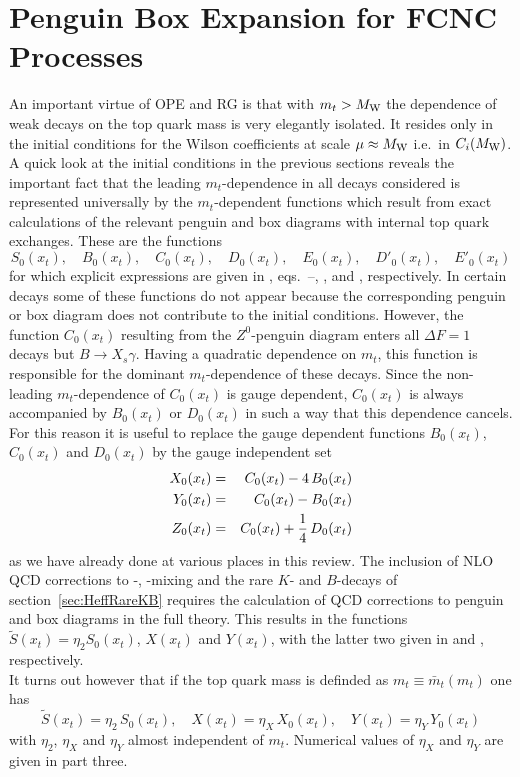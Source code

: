 \section{Penguin Box Expansion for FCNC Processes}
         \label{sec:PBE}
An important virtue of OPE and RG is that with $m_t > M_{\rm W}$ the
dependence of weak decays on the top quark mass is very elegantly
isolated. It resides only in the initial conditions for the Wilson
coefficients at scale $\mu \approx M_{\rm W}$ i.e.~in $C_i(M_{\rm W})$. A quick look
at the initial conditions in the previous sections reveals the important
fact that the leading $m_t$-dependence in all decays considered is
represented universally by the $m_t$-dependent functions which result
from exact calculations of the relevant penguin and box diagrams with
internal top quark exchanges. These are the functions
\begin{equation}
S_0(x_t), \quad
B_0(x_t), \quad
C_0(x_t), \quad
D_0(x_t), \quad
E_0(x_t), \quad
D'_0(x_t), \quad
E'_0(x_t)
\label{eq:SBCDE}
\end{equation}
for which explicit expressions are given in ,
eqs.~--, ,  and ,
respectively. In certain decays some of these functions do not appear
because the corresponding penguin or box diagram does not contribute to
the initial conditions. However, the function $C_0(x_t)$ resulting from
the $Z^0$-penguin diagram enters all $\Delta F=1$ decays but $B \to X_s
\gamma$. Having a quadratic dependence on $m_t$, this function
is responsible for the dominant $m_t$-dependence of these
decays. Since the non-leading $m_t$-dependence of $C_0(x_t)$ is gauge
dependent, $C_0(x_t)$ is always accompanied by $B_0(x_t)$ or $D_0(x_t)$
in such a way that this dependence cancels. For this reason it is
useful to replace the gauge dependent functions $B_0(x_t)$, $C_0(x_t)$
and $D_0(x_t)$ by the gauge independent set \cite{buchallaetal:91}
\begin{eqnarray}
X_0(x_t) &=& C_0(x_t) - 4 \, B_0(x_t)           \nonumber \\
Y_0(x_t) &=& C_0(x_t) - B_0(x_t)                \label{eq:XYZ} \\
Z_0(x_t) &=& C_0(x_t) + \frac{1}{4} \, D_0(x_t) \nonumber
\end{eqnarray}
as we have already done at various places in this review.  The
inclusion of NLO QCD corrections to \BB-, \KK-mixing and the rare $K$-
and $B$-decays of section~\ref{sec:HeffRareKB} requires the calculation
of QCD corrections to penguin and box diagrams in the full theory. This
results in the functions $\tilde{S}(x_t)=\eta_2 S_0(x_t)$, $X(x_t)$ and
$Y(x_t)$, with the latter two given in  and , respectively.
\\
It turns out however that if the top quark mass is definded as $m_t
\equiv \bar{m}_t(m_t)$ one has
\begin{equation}
\tilde{S}(x_t) = \eta_2 \, S_0(x_t), \quad
X(x_t) = \eta_X \, X_0(x_t), \quad
Y(x_t) = \eta_Y \, Y_0(x_t)
\label{eq:SXY}
\end{equation}
with $\eta_2$, $\eta_X$ and $\eta_Y$ almost independent of $m_t$.
Numerical values of $\eta_X$ and $\eta_Y$ are given in part three.

